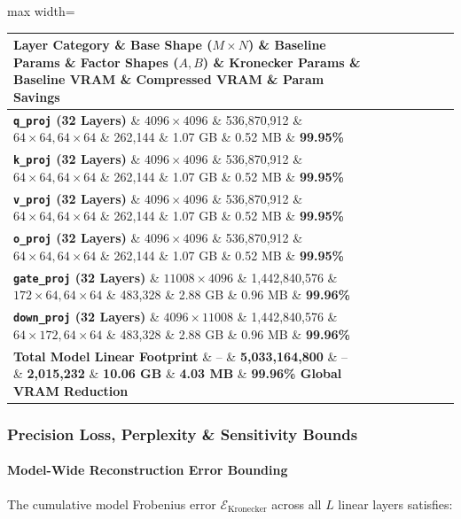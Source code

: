 \begin{center}
\begin{adjustbox}{max width=\columnwidth}
\renewcommand{\arraystretch}{1.2}
\begin{tabular}{llllllll}
\toprule
Layer Category \& Base Shape ($M \times N$) \& Baseline Params \& Factor Shapes ($A, B$) \& Kronecker Params \& Baseline VRAM \& Compressed VRAM \& Param Savings \\
\midrule
\textbf{\texttt{q\_proj} (32 Layers)} \& $4096 \times 4096$ \& 536,870,912 \& $64 \times 64, 64 \times 64$ \& 262,144 \& 1.07 GB \& 0.52 MB \& \textbf{99.95\%} \\
\textbf{\texttt{k\_proj} (32 Layers)} \& $4096 \times 4096$ \& 536,870,912 \& $64 \times 64, 64 \times 64$ \& 262,144 \& 1.07 GB \& 0.52 MB \& \textbf{99.95\%} \\
\textbf{\texttt{v\_proj} (32 Layers)} \& $4096 \times 4096$ \& 536,870,912 \& $64 \times 64, 64 \times 64$ \& 262,144 \& 1.07 GB \& 0.52 MB \& \textbf{99.95\%} \\
\textbf{\texttt{o\_proj} (32 Layers)} \& $4096 \times 4096$ \& 536,870,912 \& $64 \times 64, 64 \times 64$ \& 262,144 \& 1.07 GB \& 0.52 MB \& \textbf{99.95\%} \\
\textbf{\texttt{gate\_proj} (32 Layers)} \& $11008 \times 4096$ \& 1,442,840,576 \& $172 \times 64, 64 \times 64$ \& 483,328 \& 2.88 GB \& 0.96 MB \& \textbf{99.96\%} \\
\textbf{\texttt{down\_proj} (32 Layers)} \& $4096 \times 11008$ \& 1,442,840,576 \& $64 \times 172, 64 \times 64$ \& 483,328 \& 2.88 GB \& 0.96 MB \& \textbf{99.96\%} \\
\textbf{Total Model Linear Footprint} \& -- \& \textbf{5,033,164,800} \& -- \& \textbf{2,015,232} \& \textbf{10.06 GB} \& \textbf{4.03 MB} \& \textbf{99.96\% Global VRAM Reduction} \\

\bottomrule
\end{tabular}
\end{adjustbox}
\end{center}

\subsubsection*{Precision Loss, Perplexity \& Sensitivity Bounds}

\paragraph{Model-Wide Reconstruction Error Bounding}
The cumulative model Frobenius error $\mathcal{E}_{\text{Kronecker}}$ across all $L$ linear layers satisfies:

